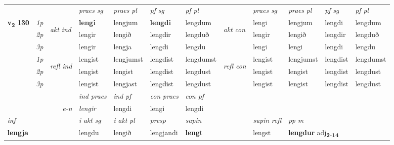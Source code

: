\begin{longtable}[l]{X>{\footnotesize\itshape}llXXXXlXXXX}
 & &   & \textit{praes sg}  & \textit{praes pl}    & \textit{ pf sg} & \textit{pf pl} & & \textit{praes sg}  & \textit{praes pl}    & \textit{pf sg} & \textit{pf pl }  \\ \cmidrule{4-7} \cmidrule{9-12}
 \multirow{2}{*}{{{\textbf{v{\textsubscript{2}}} \Large{\textbf{130}}}}}  & 1p & \multirow{3}{*}{\begin{turn}{90}\textit{akt ind}\end{turn}} & \textbf{lengi} & lengjum & \textbf{lengdi} & lengdum & \multirow{3}{*}{\begin{turn}{90}\textit{akt con}\end{turn}} &lengi & lengjum & lengdi & lengdum\\*
 & 2p &  &  lengir  & lengið & lengdir & lengduð & & lengir & lengið & lengdir & lengduð \\*
 & 3p &  & lengir & lengja & lengdi & lengdu & & lengi & lengi& lengdi & lengdu \\*
\cmidrule{4-7} \cmidrule{9-12}
 & 1p & \multirow{3}{*}{\begin{turn}{90}\textit{refl ind}\end{turn}}  & lengist & lengjumst & lengdist & lengdumst & \multirow{3}{*}{\begin{turn}{90}\textit{refl con}\end{turn}}  &lengist & lengjumst & lengdist & lengdumst \\*
 & 2p &  & lengist & lengist & lengdist & lengdust & &lengist & lengist & lengdist & lengdust \\*
 & 3p  & & lengist & lengjast & lengdist & lengdust & & lengist & lengist& lengdist & lengdust \\*
\cmidrule{4-7} \cmidrule{9-12}

   && &  \textit{ind praes} & \textit{ind pf} & \textit{con praes} & \textit{con pf} \\*
\multicolumn{3}{r}{\textit{e-n}} & lengir & lengdi & lengi & lengdi \\*

\cmidrule{4-7}
   {\textit{inf}} & &  & \textit{i akt sg} & \textit{i akt pl}   & \textit{presp} & \textit{supin} && \textit{supin refl} & \textit{pp m} \\*
  {\textbf{lengja}} & && lengdu  & lengið   & lengjandi &  \textbf{lengt} && lengst & \multicolumn{2}{l}{\textbf{lengdur} adj\textbf{\textsubscript{2-14}}} \\*

\midrule


\end{longtable}
